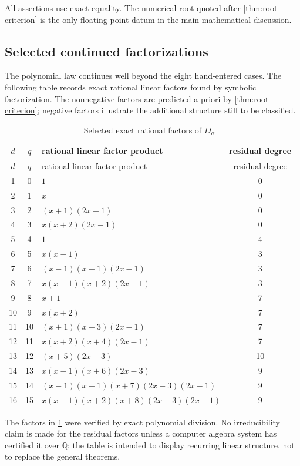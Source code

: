 \documentclass[11pt]{article}
\theoremstyle{definition}
\theoremstyle{remark}
\newcommand{\Q}{\mathbb Q}
\newcommand{\Diag}{D}
\begin{document}
All assertions use exact equality.  The numerical root quoted after
\cref{thm:root-criterion} is the only floating-point datum in the main
mathematical discussion.

\subsection{Selected continued factorizations}

The polynomial law continues well beyond the eight hand-entered cases.  The
following table records exact rational linear factors found by symbolic
factorization.  The nonnegative factors are predicted a priori by
\cref{thm:root-criterion}; negative factors illustrate the additional
structure still to be classified.

\begin{longtable}{c c p{} c}
\caption{Selected exact rational factors of \(\Diag_q\).\label{tab:factorizations}}\\
\toprule
\(d\)&\(q\)&rational linear factor product&residual degree\\
\midrule
\endfirsthead
\toprule
\(d\)&\(q\)&rational linear factor product&residual degree\\
\midrule
\endhead
1&0&\(1\)&0\\
2&1&\(x\)&0\\
3&2&\((x+1)(2x-1)\)&0\\
4&3&\(x(x+2)(2x-1)\)&0\\
5&4&\(1\)&4\\
6&5&\(x(x-1)\)&3\\
7&6&\((x-1)(x+1)(2x-1)\)&3\\
8&7&\(x(x-1)(x+2)(2x-1)\)&3\\
9&8&\(x+1\)&7\\
10&9&\(x(x+2)\)&7\\
11&10&\((x+1)(x+3)(2x-1)\)&7\\
12&11&\(x(x+2)(x+4)(2x-1)\)&7\\
13&12&\((x+5)(2x-3)\)&10\\
14&13&\(x(x-1)(x+6)(2x-3)\)&9\\
15&14&\((x-1)(x+1)(x+7)(2x-3)(2x-1)\)&9\\
16&15&\(x(x-1)(x+2)(x+8)(2x-3)(2x-1)\)&9\\
\bottomrule
\end{longtable}

The factors in \cref{tab:factorizations} were verified by exact polynomial
division.  No irreducibility claim is made for the residual factors unless a
computer algebra system has certified it over \(\Q\); the table is intended
to display recurring linear structure, not to replace the general theorems.
\end{document}
